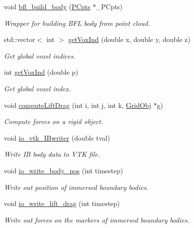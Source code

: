 \begin{DoxyCompactItemize}
void \hyperlink{class_object_manager_a56c65bd5122aa7e7026fb8d2315482f3}{bfl\+\_\+build\+\_\+body} (\hyperlink{class_p_cpts}{P\+Cpts} $\ast$\+\_\+\+P\+Cpts)
\begin{DoxyCompactList}\small\item\em Wrapper for building B\+FL body from point cloud. \end{DoxyCompactList}\item 
std\+::vector$<$ int $>$ \hyperlink{class_object_manager_a68230ad49b979c2fe963cb3632a60c3a}{get\+Vox\+Ind} (double x, double y, double z)
\begin{DoxyCompactList}\small\item\em Get global voxel indices. \end{DoxyCompactList}\item 
int \hyperlink{class_object_manager_a8e8e70f60dfb9d35d2e320c7c2b3b33c}{get\+Vox\+Ind} (double p)
\begin{DoxyCompactList}\small\item\em Get global voxel index. \end{DoxyCompactList}\item 
void \hyperlink{class_object_manager_a6a35b34d77e7cd56060a6953d0d0860a}{compute\+Lift\+Drag} (int i, int j, int k, \hyperlink{class_grid_obj}{Grid\+Obj} $\ast$g)
\begin{DoxyCompactList}\small\item\em Compute forces on a rigid object. \end{DoxyCompactList}\item 
void \hyperlink{class_object_manager_a39aa351c7b338473be4871111da5c5bd}{io\+\_\+vtk\+\_\+\+I\+Bwriter} (double tval)
\begin{DoxyCompactList}\small\item\em Write IB body data to V\+TK file. \end{DoxyCompactList}\item 
void \hyperlink{class_object_manager_a1f9a40c58bdb3bd9797f7c44864835ec}{io\+\_\+write\+\_\+body\+\_\+pos} (int timestep)
\begin{DoxyCompactList}\small\item\em Write out position of immersed boundary bodies. \end{DoxyCompactList}\item 
void \hyperlink{class_object_manager_ab46e89c9eaf8ca1c9ec264545f39cd7f}{io\+\_\+write\+\_\+lift\+\_\+drag} (int timestep)
\begin{DoxyCompactList}\small\item\em Write out forces on the markers of immersed boundary bodies. \end{DoxyCompactList}\item 

\end{DoxyCompactItemize}
